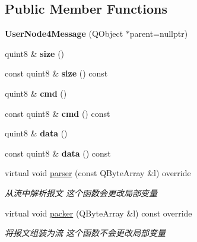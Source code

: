 \subsection*{Public Member Functions}
\begin{DoxyCompactItemize}
\item 
\mbox{\label{class_user_node4_message_aaa46941363de30cbe344667171d00ba5}} 
{\bfseries User\+Node4\+Message} (Q\+Object $\ast$parent=nullptr)
\item 
\mbox{\label{class_user_node4_message_aa38288694739ae016b271777b79e113d}} 
quint8 \& {\bfseries size} ()
\item 
\mbox{\label{class_user_node4_message_a168ca5bff3b99b950a9ac5c12125bc63}} 
const quint8 \& {\bfseries size} () const
\item 
\mbox{\label{class_user_node4_message_aebe58e3c3519fd612b5e828e4c0a3ce2}} 
quint8 \& {\bfseries cmd} ()
\item 
\mbox{\label{class_user_node4_message_ae63b7fe3e9a454e60a76788711a87fd7}} 
const quint8 \& {\bfseries cmd} () const
\item 
\mbox{\label{class_user_node4_message_a6ef221e1f09668266d7babf144109083}} 
quint8 \& {\bfseries data} ()
\item 
\mbox{\label{class_user_node4_message_ad168bdb225bc94c9b34619c88b927709}} 
const quint8 \& {\bfseries data} () const
\item 
virtual void \mbox{\hyperlink{class_user_node4_message_a758152d93aebcd76949f1fb47ea9cdd5}{parser}} (const Q\+Byte\+Array \&l) override
\begin{DoxyCompactList}\small\item\em 从流中解析报文 这个函数会更改局部变量 \end{DoxyCompactList}\item 
virtual void \mbox{\hyperlink{class_user_node4_message_a2ed30883418df021917a62ff1b27c269}{packer}} (Q\+Byte\+Array \&l) const override
\begin{DoxyCompactList}\small\item\em 将报文组装为流 这个函数不会更改局部变量 \end{DoxyCompactList}\end{DoxyCompactItemize}


